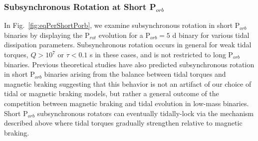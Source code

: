 \documentclass[twocolumn]{aastex61}
\begin{document}


\subsubsection{Subsynchronous Rotation at Short P$_{orb}$}

In Fig.~\ref{fig:eqPerShortPorb}, we examine subsynchronous rotation in short P$_{orb}$ binaries by displaying the P$_{rot}$ evolution for a P$_{orb} = 5$ d binary for various tidal dissipation parameters. Subsynchronous rotation occurs in general for weak tidal torques, $Q>10^7$ or $\tau < 0.1$ s in these cases, and is not restricted to long P$_{orb}$ binaries. Previous theoretical studies have also predicted subsynchronous rotation in short P$_{orb}$ binaries arising from the balance between tidal torques and magnetic braking \citep[e.g.][]{Habets1989,Zahn1994,Keppens1997} suggesting that this behavior is not an artifact of our choice of tidal or magnetic braking models, but rather a general outcome of the competition between magnetic braking and tidal evolution in low-mass binaries.  Short P$_{orb}$ subsynchronous rotators can eventually tidally-lock via the mechanism described above where tidal torques gradually strengthen relative to magnetic braking. 
\end{document}
